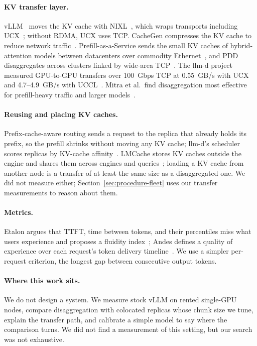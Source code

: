 \documentclass[11pt]{article}
\begin{document}
\paragraph{KV transfer layer.} vLLM~\cite{vllm} moves the KV cache with NIXL~\cite{nixl}, which wraps transports including UCX~\cite{ucx}; without RDMA, UCX uses TCP. CacheGen compresses the KV cache to reduce network traffic~\cite{cachegen}. Prefill-as-a-Service sends the small KV caches of hybrid-attention models between datacenters over commodity Ethernet~\cite{prfaas}, and PDD disaggregates across clusters linked by wide-area TCP~\cite{pdd}. The llm-d project measured GPU-to-GPU transfers over 100~Gbps TCP at 0.55~GB/s with UCX and 4.7--4.9~GB/s with UCCL~\cite{llmdblog}. Mitra et al.\ find disaggregation most effective for prefill-heavy traffic and larger models~\cite{beyondbuzz}.

\paragraph{Reusing and placing KV caches.} Prefix-cache-aware routing sends a request to the replica that already holds its prefix, so the prefill shrinks without moving any KV cache; llm-d's scheduler scores replicas by KV-cache affinity~\cite{llmdarch}. LMCache stores KV caches outside the engine and shares them across engines and queries~\cite{lmcache}; loading a KV cache from another node is a transfer of at least the same size as a disaggregated one. We did not measure either; Section~\ref{sec:procedure-fleet} uses our transfer measurements to reason about them.

\paragraph{Metrics.} Etalon argues that TTFT, time between tokens, and their percentiles miss what users experience and proposes a fluidity index~\cite{etalon}; Andes defines a quality of experience over each request's token delivery timeline~\cite{andes}. We use a simpler per-request criterion, the longest gap between consecutive output tokens.

\paragraph{Where this work sits.} We do not design a system. We measure stock vLLM on rented single-GPU nodes, compare disaggregation with colocated replicas whose chunk size we tune, explain the transfer path, and calibrate a simple model to say where the comparison turns. We did not find a measurement of this setting, but our search was not exhaustive.
\end{document}
